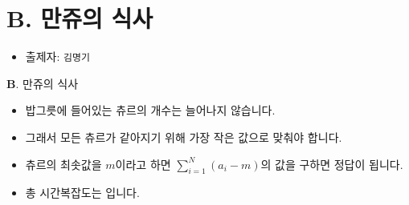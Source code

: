\section{B. 만쥬의 식사}

\begin{frame} %
    \begin{itemize}
        \item 출제자: \texttt{김명기}
    \end{itemize}
\end{frame}

\begin{frame}{\textbf{B}. 만쥬의 식사}
    \begin{itemize}
        \item 밥그릇에 들어있는 츄르의 개수는 늘어나지 않습니다.
        \item 그래서 모든 츄르가 같아지기 위해 가장 작은 값으로 맞춰야 합니다.
        \item 츄르의 최솟값을 $m$이라고 하면 $\sum_{i=1}^N (a_i - m)$의 값을 구하면 정답이 됩니다.
		\item 총 시간복잡도는 입니다.
    \end{itemize}
\end{frame}